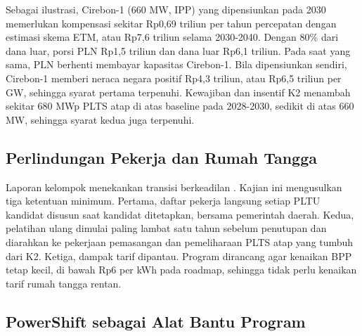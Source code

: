 Sebagai ilustrasi, Cirebon-1 (660 MW, IPP) yang dipensiunkan pada 2030 memerlukan kompensasi sekitar Rp0,69 triliun per tahun percepatan dengan estimasi skema ETM, atau Rp7,6 triliun selama 2030-2040. Dengan 80\% dari dana luar, porsi PLN Rp1,5 triliun dan dana luar Rp6,1 triliun. Pada saat yang sama, PLN berhenti membayar kapasitas Cirebon-1. Bila dipensiunkan sendiri, Cirebon-1 memberi neraca negara positif Rp4,3 triliun, atau Rp6,5 triliun per GW, sehingga syarat pertama terpenuhi. Kewajiban dan insentif K2 menambah sekitar 680 MWp PLTS atap di atas baseline pada 2028-2030, sedikit di atas 660 MW, sehingga syarat kedua juga terpenuhi.

\subsection{Perlindungan Pekerja dan Rumah Tangga}

Laporan kelompok menekankan transisi berkeadilan \cite{L-LAPORAN-K17}. Kajian ini mengusulkan tiga ketentuan minimum. Pertama, daftar pekerja langsung setiap PLTU kandidat disusun saat kandidat ditetapkan, bersama pemerintah daerah. Kedua, pelatihan ulang dimulai paling lambat satu tahun sebelum penutupan dan diarahkan ke pekerjaan pemasangan dan pemeliharaan PLTS atap yang tumbuh dari K2. Ketiga, dampak tarif dipantau. Program dirancang agar kenaikan BPP tetap kecil, di bawah Rp6 per kWh pada roadmap, sehingga tidak perlu kenaikan tarif rumah tangga rentan.

\subsection{PowerShift sebagai Alat Bantu Program}

